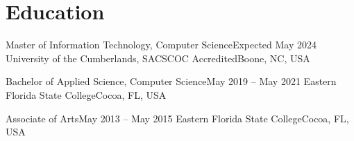 \section{Education}
\mySubHeadingListStart

  \mySubHeading
    {Master of Information Technology, Computer Science}{Expected May 2024}
    {University of the Cumberlands, SACSCOC Accredited}{Boone, NC, USA}

  \mySubHeading
    {Bachelor of Applied Science, Computer Science}{May 2019 -- May 2021}
    {Eastern Florida State College}{Cocoa, FL, USA}

  \mySubHeading
    {Associate of Arts}{May 2013 -- May 2015}
    {Eastern Florida State College}{Cocoa, FL, USA}

\mySubHeadingListEnd
